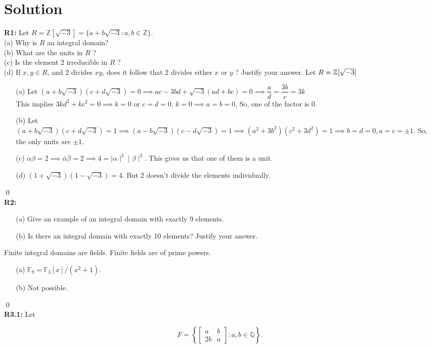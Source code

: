 \section{Solution}
\textbf{R1:} Let $R=\mathbb{Z}[\sqrt{-3}]=\{a+b \sqrt{-3}: a, b \in \mathbb{Z}\}$.\\
(a) Why is $R$ an integral domain?\\
(b) What are the units in $R$ ?\\
(c) Is the element 2 irreducible in $R$ ?\\
(d) If $x, y \in R$, and 2 divides $x y$, does it follow that 2 divides either $x$ or $y$ ? Justify your answer.
\soln Let $ R=\mathbb{Z}[\sqrt{-3}] $
\begin{itemize}
	\item[(a)] Let $ (a+b\sqrt{-3})(c+d\sqrt{-3})=0\implies ac-3bd +\sqrt{-3}(ad+bc) = 0\implies \dfrac{a}{d}=\dfrac{3b}{c}=3k $\\
	This implies $ 3kd^2 + kc^2=0 \implies k=0$ or $ c=d=0 $. $ k=0\implies a=b=0 $, So, one of the factor is $ 0 $. 
	\item[(b)] Let $ (a+b\sqrt{-3})(c+d\sqrt{-3})=1 \implies (a-b\sqrt{-3})(c-d\sqrt{-3})=1 \implies (a^2 +3b^2)(c^2+3d^2)=1\implies b=d=0, a=c=\pm 1 $. So, the only units are $ \pm 1 $.
	\item[(c)] $ \alpha\beta=2 \implies \bar{\alpha}\bar{\beta}=2 \implies 4= \mid\alpha\mid^2\mid\beta\mid^2$. This gives us that one of them is a unit.
	\item[(d)] $ (1+\sqrt{-3})(1-\sqrt{-3})=4 $. But $ 2 $ doesn't divide the elements individually.
\end{itemize}
\qed\\
\textbf{R2:} 
\begin{itemize}
	\item[(a)] Give an example of an integral domain with exactly 9 elements.
	\item[(b)] Is there an integral domain with exactly 10 elements? Justify your answer. 
\end{itemize}
\soln
Finite integral domains are fields. Finite fields are of prime powers.
\begin{itemize}
	\item[(a)] $ \mathbb{F}_9=\mathbb{F}_3[x]/(x^2+1) $.
	\item[(b)] Not possible.
\end{itemize} 
\qed\\
\textbf{R3.1:} Let

$$
F=\left\{\left[\begin{array}{cc}
	a & b \\
	2 b & a
\end{array}\right]: a, b \in \mathbb{Q}\right\} .
$$

